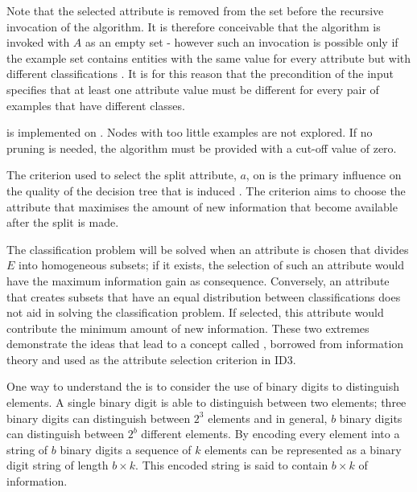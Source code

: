 Note that the selected attribute is removed from the set before the recursive invocation of the algorithm. It is therefore conceivable that the algorithm is invoked with $A$ as an empty set - however such an invocation is possible only if the example set contains entities with the same value for every attribute but with different classifications \cite{bratko:learning}.  It is for this reason that the precondition of the input specifies that at least one attribute value must be different for every pair of examples that have different classes.

 is implemented on .  Nodes with too little examples are not explored. If no pruning is needed, the algorithm must be provided with a cut-off value of zero.  

The criterion used to select the split attribute, $a$, on  is the primary influence on the quality of the decision tree that is induced \cite{kubat:review}. The  criterion aims to choose the attribute that maximises the amount of new information that become available after the split is made. 

The classification problem will be solved when an attribute is chosen that divides $E$ into homogeneous subsets; if it exists, the selection of such an attribute would have the maximum information gain as consequence.  Conversely, an attribute that creates subsets that have an equal distribution between classifications does not aid in solving the classification problem. If selected, this attribute would contribute the minimum amount of new information. These two extremes demonstrate the ideas that lead to a concept called  \cite{shannon:theory}, borrowed from information theory and used as the attribute selection criterion in ID3.


One way to understand the  is to consider the use of binary digits to distinguish elements.  A single  binary digit is able to distinguish between two elements; three binary digits can distinguish between $2^3$ elements and in general, $b$ binary digits can distinguish between $2^b$ different elements. By encoding every element into a string of $b$ binary digits a sequence of $k$ elements can be represented as a binary digit string of length $b \times k$.  This encoded string is said to contain $b \times k$  of information.  

